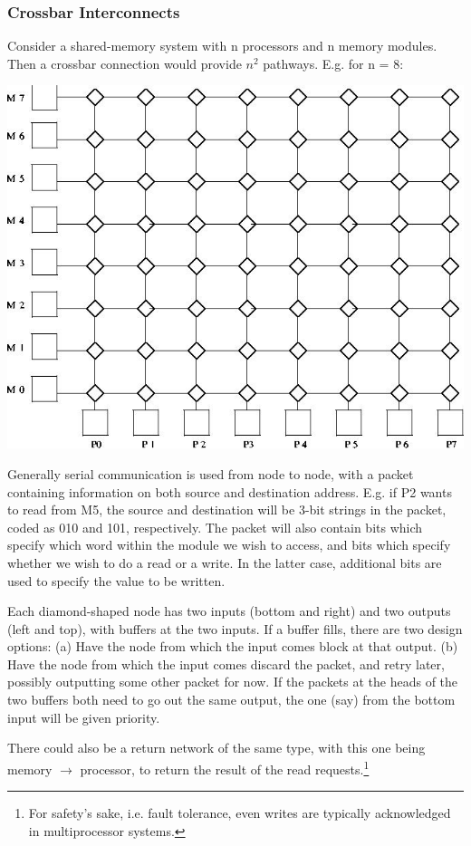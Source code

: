 \subsubsection{Crossbar Interconnects}

Consider a shared-memory system with n processors and n memory modules.
Then a crossbar connection would provide \( n^{2} \) pathways. E.g. for n =
8:

\includegraphics{Images/XBar.jpg}

Generally serial communication is used from node to node, with a packet
containing information on both source and destination address. E.g. if
P2 wants to read from M5, the source and destination will be 3-bit
strings in the packet, coded as 010 and 101, respectively.  The packet
will also contain bits which specify which word within the module we
wish to access, and bits which specify whether we wish to do a read or a
write.  In the latter case, additional bits are used to specify the
value to be written.

Each diamond-shaped node has two inputs (bottom and right) and two
outputs (left and top), with buffers at the two inputs.  If a buffer
fills, there are two design options: (a) Have the node from which the
input comes block at that output. (b) Have the node from which the input
comes discard the packet, and retry later, possibly outputting some
other packet for now.  If the packets at the heads of the two buffers
both need to go out the same output, the one (say) from the bottom input
will be given priority.

There could also be a return network of the same type, with this one
being memory \( \rightarrow  \) processor, to return the result of the
read requests.\footnote{For safety's sake, i.e. fault tolerance, even
writes are typically acknowledged in multiprocessor systems.}

